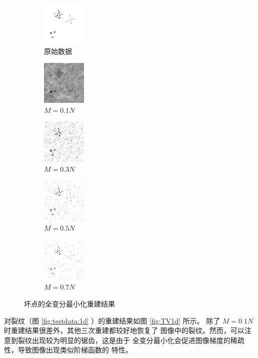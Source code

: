 \begin{figure}
\centering
\begin{subfigure}[t]{1.1in}
	\includegraphics{Figure/testdata/0d.png}
	\caption{原始数据}
\end{subfigure}
\begin{subfigure}[t]{1.1in}
	\includegraphics{Figure/TV/0d10.png}
	\caption{$M = 0.1 N$}
\end{subfigure}
\begin{subfigure}[t]{1.1in}
	\includegraphics{Figure/TV/0d30.png}
	\caption{$M = 0.3 N$}
\end{subfigure}
\begin{subfigure}[t]{1.1in}
	\includegraphics{Figure/TV/0d50.png}
	\caption{$M = 0.5 N$}
\end{subfigure}
\begin{subfigure}[t]{1.1in}
	\includegraphics{Figure/TV/0d70.png}
	\caption{$M = 0.7 N$}
\end{subfigure}
\caption{坏点的全变分最小化重建结果}
\label{fig:TV0d}
\end{figure}

对裂纹（图 \ref{fig:testdata:1d} ）的重建结果如图 \ref{fig:TV1d} 所示。
除了 $M = 0.1N$ 时重建结果很差外，其他三次重建都较好地恢复了
图像中的裂纹。然而，可以注意到裂纹出现较为明显的锯齿，这是由于
全变分最小化会促进图像梯度的稀疏性，导致图像出现类似阶梯函数的
特性。

